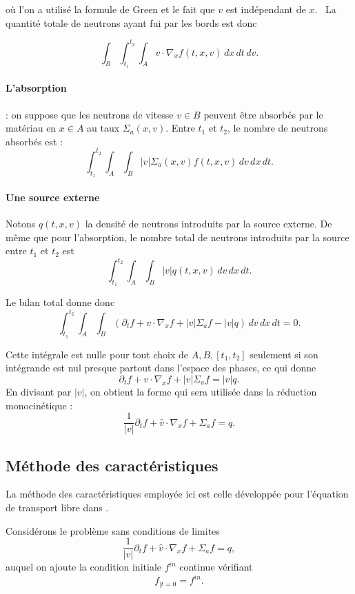 \documentclass{article}
\begin{document}
où l’on a utilisé la formule de Green et le fait que $v$ est indépendant de $x$. \
La quantité totale de neutrons ayant fui par les bords est donc

\[
\int_B\int_{t_1}^{t_2}\int_A
v\cdot\nabla_x f(t,x,v)\,dx\,dt\,dv.
\]

\vspace{0.5cm}

\paragraph{L’absorption} : on suppose que les neutrons de vitesse $v \in B$ peuvent être absorbés par le matériau en $x \in A$ au taux $\Sigma_a(x,v)$. Entre $t_1$ et $t_2$, le nombre de neutrons absorbés est :
\[
\int_{t_1}^{t_2}\int_A\int_B
|v|\Sigma_a(x,v)f(t,x,v)\,dv\,dx\,dt.
\]

\paragraph{Une source externe} Notons $q(t,x,v)$ la densité de neutrons introduits par la source externe. De même que pour l’absorption, le nombre total de neutrons introduits par la source entre $t_1$ et $t_2$ est
\[
\int_{t_1}^{t_2}\int_A\int_B
|v|q(t,x,v)\,dv\,dx\,dt.
\]

Le bilan total donne donc
\[
\int_{t_1}^{t_2}\int_A\int_B
\left(\partial_t f+v\cdot\nabla_x f+|v|\Sigma_a f-|v|q\right)
\,dv\,dx\,dt=0.
\]

Cette intégrale est nulle pour tout choix de $A,B,[t_1,t_2]$ seulement si son intégrande est nul presque partout dans l’espace des phases, ce qui donne
\begin{equation}
    \partial_t f+v\cdot\nabla_x f+|v|\Sigma_a f=|v|q.
\end{equation}
En divisant par $|v|$, on obtient la forme qui sera utilisée dans la réduction monocinétique :
\begin{equation}
\frac1{|v|}\partial_t f+\widehat v\cdot\nabla_x f+\Sigma_a f=q.
\label{eq:transport-cinetique}
\end{equation}

\subsection{Méthode des caractéristiques}
La méthode des caractéristiques employée ici est celle développée pour l'équation de transport libre dans \cite[chap.~2, sections~2.1--2.2]{Allaire2018}.

Considérons le problème sans conditions de limites
\[
\frac{1}{|v|}\partial_t f+\widehat v\cdot\nabla_x f+\Sigma_a f=q,
\]
auquel on ajoute la condition initiale $f^{in}$ continue vérifiant
\[
f_{|t=0}=f^{in}.
\]
\end{document}
